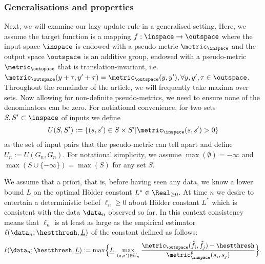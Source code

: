 \subsubsection{Generalisations and properties} 
Next, we will examine our lazy update rule in a generalised setting. Here, we assume the target function is a mapping $f: \inspace \to \outspace$ where the input space $\inspace$ is endowed with a pseudo-metric $\metric_\inspace$ and the output space $\outspace$ is an additive group, endowed with a pseudo-metric $\metric_\outspace$ that is translation-invariant, i.e. $\metric_\outspace(y+\tau,y'+\tau) = \metric_\outspace(y,y'),\forall y,y',\tau \in \outspace$. Throughout the remainder of the article, we will frequently take maxima over sets. 
Now allowing for non-definite pseudo-metrics, we need to ensure none of the denominators can be zero. For notiational convenience, for two sets $S,S' \subset \inspace$ of inputs we define  $$U(S,S') := \{(s,s') \in S \times S' | \metric_\inspace(s,s') >0\}$$ as the set of input pairs that the pseudo-metric can tell apart and define $U_n := U(G_n,G_n) $.
For notational simplicity, we assume $\max(\emptyset) = -\infty$ and $\max(S\cup \{
-\infty\}) = \max (S)$ for any set $S$.

We assume that a priori, that is, before having seen any data, we know a lower bound $\underline L$ on the optimal H\"older constant $L^* \in \Real_{\geq 0}$.
At time $n$ we desire to entertain a deterministic belief $\ell_n \geq 0$ about H\"older constant $L^*$ which is consistent with the data $\data_n$ observed so far.
In this context consistency means that 
$\ell_n $ is at least as large as the empirical estimator $\ell({\data_n};\hestthresh,\underline L)$ of the constant defined as follows:  
\begin{equation}\label{eq:lazyconstupdaterule_batch}
\ell(\data_n;\hestthresh,\underline L)  := 
 \max \Bigl\{ \underline L, \max_{(s,s') \in U_n} \frac{\metric_\outspace(\tilde f_i,\tilde f_j) - \hestthresh}{\metric_{\inspace}^p(s_i,s_j)}\Bigr\}.
\end{equation}

